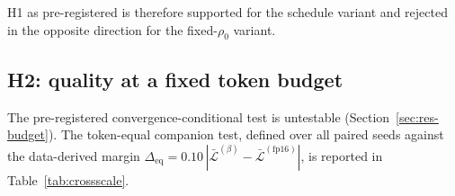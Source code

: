 \documentclass[final,5p,times,twocolumn]{elsarticle}
\theoremstyle{remark}
\newcommand{\rhoz}{\rho_{0}}
\begin{document}
H1 as pre-registered is therefore supported for the schedule variant and
rejected in the opposite direction for the fixed-$\rhoz$ variant.

\subsection{H2: quality at a fixed token budget}
\label{sec:res-h2}

The pre-registered convergence-conditional test is untestable
(Section~\ref{sec:res-budget}). The token-equal companion test, defined over
all paired seeds against the data-derived margin
$\Delta_{\mathrm{eq}} = 0.10\,|\bar{\mathcal{L}}^{(\beta)} -
\bar{\mathcal{L}}^{(\mathrm{fp16})}|$, is reported in
Table~\ref{tab:crossscale}.
\end{document}
